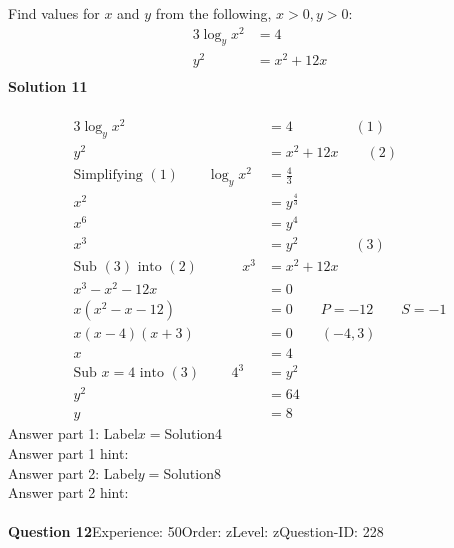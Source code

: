 \documentclass{article}
\begin{document}
Find values for $x$ and $y$ from the following, $x>0 , y>0$:
\begin{align*}
3\log_{y}x^2&=4\\[2pt]
y^2&=x^2+12x\\[-22pt]
\end{align*}
\noindent\textbf{Solution 11}\\[2pt]
\\[-35pt]\begin{align*}
3\log_{y}x^2&=4\hspace{53pt}(1)\\[2pt]
y^2&=x^2+12x\qquad (2)\\[2pt]
\text{Simplifying}\,\,(1)\qquad \log_{y}x^2&=\displaystyle\frac{4}{3}\\[2pt]
x^2&=y^{\displaystyle\frac{4}{3}}\\[2pt]
x^6&=y^4\\[2pt]
x^3&=y^2\hspace{48pt}(3)\\[2pt]
\text{Sub}\,\,(3)\,\,\text{into}\,\,(2)\hspace{38pt} x^3&=x^2+12x\\[2pt]
x^3-x^2-12x&=0\\[2pt]
x(x^2-x-12)&=0\qquad P=-12\qquad S=-1\\[2pt]
x(x-4)(x+3)&=0\qquad (-4,3)\\[2pt]
x&=4\\[12pt]
\text{Sub}\,\,x=4\,\,\text{into}\,\,(3)\hspace{27pt} 4^3&=y^2\\[2pt]
y^2&=64\\[2pt]
y&=8
\end{align*}
Answer part 1: \hspace{10pt}Label\hspace{10pt}$x=$\hspace{10pt}Solution\hspace{10pt}4\\
Answer part 1 hint: \hspace{15pt}\\
Answer part 2: \hspace{10pt}Label\hspace{10pt}$y=$\hspace{10pt}Solution\hspace{10pt}8\\
Answer part 2 hint: \hspace{15pt}\\
\\[4pt]
\noindent\textbf{Question 12}\hspace{20pt}Experience: 50\hspace{20pt}Order: z\hspace{20pt}Level: z\hspace{20pt}Question-ID: 228\\[2pt]
\end{document}
